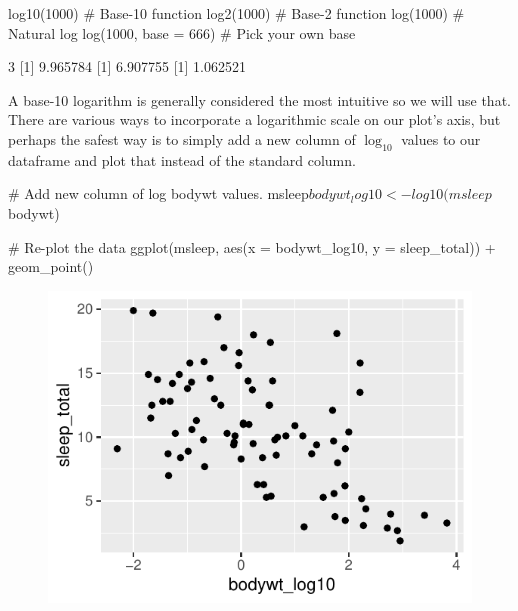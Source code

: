 \begin{inR}
log10(1000) # Base-10 function
log2(1000) # Base-2 function
log(1000) # Natural log
log(1000, base = 666) # Pick your own base
\end{inR}
\begin{outR}
[1] 3
[1] 9.965784
[1] 6.907755
[1] 1.062521
\end{outR}

A base-10 logarithm is generally considered the most intuitive so we will use that. There are various ways to incorporate a logarithmic scale on our plot's axis, but perhaps the safest way is to simply add a new column of $\log_{10}$ values to our dataframe and plot that instead of the standard  column.

\begin{inR}
# Add new column of log bodywt values.
msleep$bodywt_log10 <- log10(msleep$bodywt)

# Re-plot the data
ggplot(msleep, aes(x = bodywt_log10, y = sleep_total)) +
  geom_point()
\end{inR}

\vspace{2em}

\begin{figure}[H]
\includegraphics[scale = 0.75]{graphics/ch2Figs/ggEx_3.pdf}
\label{fig:ggEx_3.pdf}
\end{figure}

